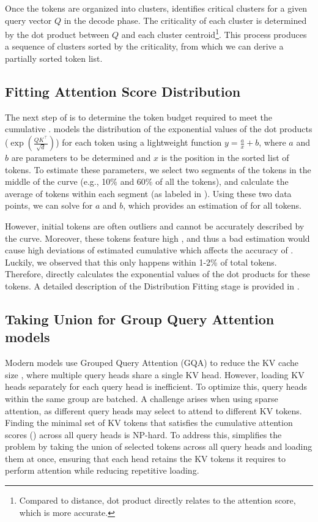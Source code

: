 Once the tokens are organized into clusters, \sys identifies critical clusters for a given query vector $Q$ in the decode phase. The criticality of each cluster is determined by the dot product between $Q$ and each cluster centroid\footnote{Compared to distance, dot product directly relates to the attention score, which is more accurate.}. This process produces a sequence of clusters sorted by the criticality, from which we can derive a partially sorted token list. 

\subsection{Fitting Attention Score Distribution}

The next step of \sys is to determine the token budget required to meet the cumulative \as{}. \sys models the distribution of the exponential values of the dot products ($\exp(\frac{QK^\top}{\sqrt{d}})$) for each token using a lightweight function \( y = \frac{a}{x} + b \), where \( a \) and \( b \) are parameters to be determined and \( x \) is the position in the sorted list of tokens.
To estimate these parameters, we select two segments of the tokens in the middle of the curve (e.g., 10\% and 60\% of all the tokens), and calculate the average of tokens within each segment (as labeled in ). Using these two data points, we can solve for \( a \) and \( b \), which provides an estimation of \as{} for all tokens.

However, initial tokens are often outliers and cannot be accurately described by the curve. Moreover, these tokens feature high \as{}, and thus a bad estimation would cause high deviations of estimated cumulative \as{} which affects the accuracy of \sys.
Luckily, we observed that this only happens within 1-2\% of total tokens. Therefore, \sys directly calculates the exponential values of the dot products for these tokens. A detailed description of the Distribution Fitting stage is provided in .

\subsection{Taking Union for Group Query Attention models}


Modern models use Grouped Query Attention (GQA) to reduce the KV cache size \cite{llama_3}, where multiple query heads share a single KV head. However, loading KV heads separately for each query head is inefficient. To optimize this, query heads within the same group are batched. A challenge arises when using sparse attention, as different query heads may select to attend to different KV tokens. Finding the minimal set of KV tokens that satisfies the cumulative attention scores (\as{}) across all query heads is NP-hard. To address this, \sys simplifies the problem by taking the union of selected tokens across all query heads and loading them at once, ensuring that each head retains the KV tokens it requires to perform attention while reducing repetitive loading.

